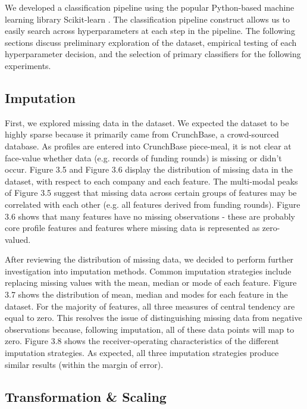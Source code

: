 \documentclass[../thesis/thesis.tex]{subfiles}
\begin{document}
We developed a classification pipeline using the popular Python-based machine learning library Scikit-learn \cite{pedregosa2011}. The classification pipeline construct allows us to easily search across hyperparameters at each step in the pipeline. The following sections discuss preliminary exploration of the dataset, empirical testing of each hyperparameter decision, and the selection of primary classifiers for the following experiments.

\subsection{Imputation}

First, we explored missing data in the dataset. We expected the dataset to be highly sparse because it primarily came from CrunchBase, a crowd-sourced database. As profiles are entered into CrunchBase piece-meal, it is not clear at face-value whether data (e.g. records of funding rounds) is missing or didn’t occur. Figure 3.5 and Figure 3.6 display the distribution of missing data in the dataset, with respect to each company and each feature. The multi-modal peaks of Figure 3.5 suggest that missing data across certain groups of features may be correlated with each other (e.g. all features derived from funding rounds).  Figure 3.6 shows that many features have no missing observations - these are probably core profile features and features where missing data is represented as zero-valued.

After reviewing the distribution of missing data, we decided to perform further investigation into imputation methods. Common imputation strategies include replacing missing values with the mean, median or mode of each feature. Figure 3.7 shows the distribution of mean, median and modes for each feature in the dataset. For the majority of features, all three measures of central tendency are equal to zero. This resolves the issue of distinguishing missing data from negative observations because, following imputation, all of these data points will map to zero. Figure 3.8 shows the receiver-operating characteristics of the different imputation strategies. As expected, all three imputation strategies produce similar results (within the margin of error).

\subsection{Transformation \& Scaling}
\end{document}
